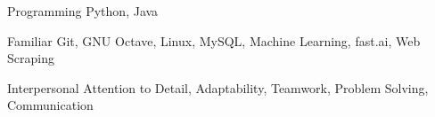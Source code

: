 

\begin{cvskills}

  \cvskill
    {Programming} %
    {Python, Java} %
    
    \cvskill
        {Familiar}
        {Git, GNU Octave, Linux, MySQL, Machine Learning, fast.ai, Web Scraping}
        
        
        
        
    \cvskill
        {Interpersonal}
        {Attention to Detail, Adaptability, Teamwork, Problem Solving, Communication}

\end{cvskills}



